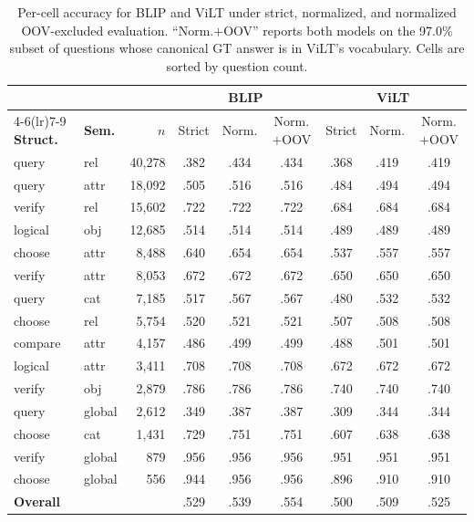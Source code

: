 \documentclass[11pt]{article}
\begin{document}
\begin{table}[h]
\centering
\small
\begin{tabular}{llr ccc ccc}
\toprule
 & & & \multicolumn{3}{c}{\textbf{BLIP}} & \multicolumn{3}{c}{\textbf{ViLT}} \\
\cmidrule(lr){4-6}\cmidrule(lr){7-9}
\textbf{Struct.} & \textbf{Sem.} & \textbf{$n$}
  & Strict & Norm. & Norm.$+$OOV
  & Strict & Norm. & Norm.$+$OOV \\
\midrule
query   & rel    & 40,278 & .382 & .434 & .434 & .368 & .419 & .419 \\
query   & attr   & 18,092 & .505 & .516 & .516 & .484 & .494 & .494 \\
verify  & rel    & 15,602 & .722 & .722 & .722 & .684 & .684 & .684 \\
logical & obj    & 12,685 & .514 & .514 & .514 & .489 & .489 & .489 \\
choose  & attr   &  8,488 & .640 & .654 & .654 & .537 & .557 & .557 \\
verify  & attr   &  8,053 & .672 & .672 & .672 & .650 & .650 & .650 \\
query   & cat    &  7,185 & .517 & .567 & .567 & .480 & .532 & .532 \\
choose  & rel    &  5,754 & .520 & .521 & .521 & .507 & .508 & .508 \\
compare & attr   &  4,157 & .486 & .499 & .499 & .488 & .501 & .501 \\
logical & attr   &  3,411 & .708 & .708 & .708 & .672 & .672 & .672 \\
verify  & obj    &  2,879 & .786 & .786 & .786 & .740 & .740 & .740 \\
query   & global &  2,612 & .349 & .387 & .387 & .309 & .344 & .344 \\
choose  & cat    &  1,431 & .729 & .751 & .751 & .607 & .638 & .638 \\
verify  & global &    879 & .956 & .956 & .956 & .951 & .951 & .951 \\
choose  & global &    556 & .944 & .956 & .956 & .896 & .910 & .910 \\
\midrule
\multicolumn{3}{l}{\textbf{Overall}}
  & .529 & .539 & .554
  & .500 & .509 & .525 \\
\bottomrule
\end{tabular}
\caption{Per-cell accuracy for BLIP and ViLT under strict, normalized, and normalized OOV-excluded evaluation. ``Norm.$+$OOV'' reports both models on the 97.0\% subset of questions whose canonical GT answer is in ViLT's vocabulary. Cells are sorted by question count.}
\label{tab:full}
\end{table}
\end{document}
